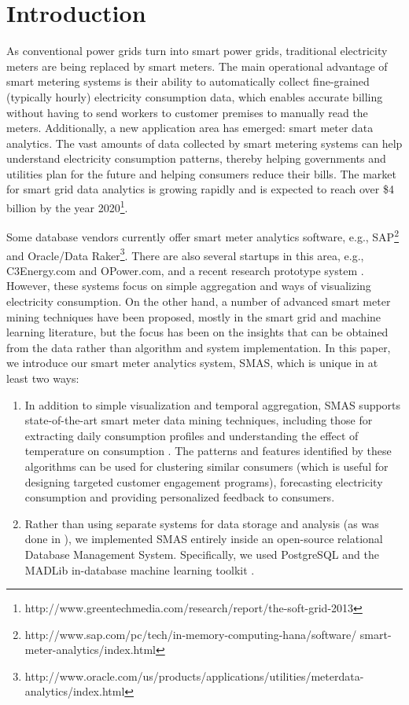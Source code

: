 \documentclass{sig-alternate}
\begin{document}
\section{Introduction}

As conventional power grids turn into smart power grids, traditional electricity meters are being replaced by smart meters.  The main operational advantage of smart metering systems is their ability to automatically collect fine-grained (typically hourly) electricity consumption data, which enables accurate billing without having to send workers to customer premises to manually read the meters.  Additionally, a new application area has emerged: smart meter data analytics.  The vast amounts of data collected by smart metering systems can help understand electricity consumption patterns, thereby helping governments and utilities plan for the future and helping consumers reduce their bills.  The market for smart grid data analytics is growing rapidly and is expected to reach over \$4 billion by the year 2020\footnote{http://www.greentechmedia.com/research/report/the-soft-grid-2013}.

Some database vendors currently offer smart meter analytics software, e.g., SAP\footnote{http://www.sap.com/pc/tech/in-memory-computing-hana/software/ smart-meter-analytics/index.html} and Oracle/Data Raker\footnote{http://www.oracle.com/us/products/applications/utilities/meterdata-analytics/index.html}.  There are also several startups in this area, e.g., C3Energy.com and OPower.com, and a recent research prototype system \cite{jarrah}.  However, these systems focus on simple aggregation and ways of visualizing electricity consumption.  On the other hand, a number of advanced smart meter mining techniques have been proposed, mostly in the smart grid and machine learning literature, but the focus has been on the insights that can be obtained from the data rather than algorithm and system implementation.  In this paper, we introduce our smart meter analytics system, SMAS, which is unique in at least two ways:

\begin{enumerate}

\item In addition to simple visualization and temporal aggregation, SMAS supports state-of-the-art smart meter data mining techniques, including those for extracting daily consumption profiles \cite{omid} and understanding the effect of temperature on consumption \cite{birt}.  The patterns and features identified by these algorithms can be used for clustering similar consumers (which is useful for designing targeted customer engagement programs), forecasting electricity consumption and providing personalized feedback to consumers.

\item Rather than using separate systems for data storage and analysis (as was done in \cite{jarrah}), we implemented SMAS entirely inside an open-source relational Database Management System.  Specifically, we used PostgreSQL and the MADLib in-database machine learning toolkit \cite{madlib}.

\end{enumerate}  
\end{document}
